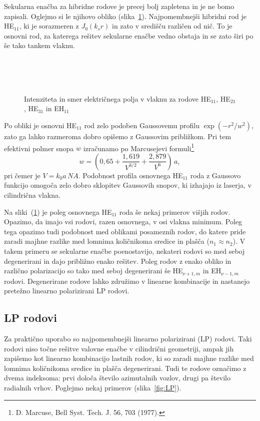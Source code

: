 Sekularna enačba za hibridne rodove je precej bolj zapletena in je ne bomo zapisali. 
Oglejmo si le njihovo obliko (slika~\ref{fig:HE11}). Najpomembnejši hibridni rod je HE$_{11}$, 
ki je sorazmeren z $J_0(k_sr)$ in zato v središču različen od nič. 
To je osnovni rod, za katerega rešitev sekularne enačbe vedno obstaja in se
zato širi po še tako tankem vlaknu. 
\begin{figure}[h]
\centering
\def\svgwidth{85truemm} 
\\
\def\svgwidth{85truemm} 
 \\
\def\svgwidth{85truemm} 
 \\
\def\svgwidth{85truemm} 

\caption{Intenziteta in smer električnega polja v vlaknu za rodove
HE$_{11}$, HE$_{21}$, HE$_{31}$ in EH$_{11}$}
\label{fig:HE11}
\end{figure}

Po obliki je osnovni HE$_{11}$ rod zelo podoben Gaussovemu profilu $\exp(-r^2/w^2)$,
zato ga lahko razmeroma dobro opišemo z Gaussovim približkom. 
Pri tem efektivni polmer snopa
$w$ izračunamo po Marcusejevi
 formuli\footnote{D. Marcuse, Bell Syst. Tech. J. 56, 703 (1977).}
\begin{equation} 
w = (0,65 + \frac{1,619}{V^{3/2}}+\frac{2,879}{V^{6}})\,a,
\label{Marcuse}
\end{equation}
pri čemer je $V = k_0 a\,NA $. Podobnost profila osnovnega
HE$_{11}$ roda z Gaussovo funkcijo omogoča zelo dobro sklopitev Gaussovih
snopov, ki izhajajo iz laserja, v cilindrična vlakna.

Na sliki~(\ref{fig:HE11}) je poleg osnovnega HE$_{11}$ roda še nekaj primerov višjih rodov. Opazimo, 
da imajo vsi rodovi, razen osnovnega, v osi vlakna minimum. Poleg tega opazimo tudi podobnost med 
oblikami posameznih rodov, do katere pride zaradi majhne razlike med lomnima količnikoma sredice in plašča
($n_1 \approx n_2$). V takem primeru se sekularne enačbe poenostavijo, nekateri rodovi so 
med seboj degenerirani in dajo približno enako rešitev. 
Poleg rodov z enako obliko in različno polarizacijo so tako 
med seboj degenerirani še HE$_{\nu+1,m}$ in EH$_{\nu-1,m}$ rodovi. Degenerirane 
rodove lahko združimo v linearne kombinacije in nastanejo pretežno 
linearno polarizirani LP rodovi. 

\subsection*{LP rodovi}
Za praktično uporabo so najpomembnejši linearno polarizirani (LP) rodovi. Taki rodovi niso
točne rešitve valovne enačbe v cilindrični geometriji, ampak jih zapišemo kot linearno 
kombinacijo lastnih rodov, ki so zaradi majhne razlike med lomnima količnikoma sredice
in plašča degenerirani. Tudi te rodove označimo z dvema indeksoma: prvi določa število azimutalnih
vozlov, drugi pa število radialnih vrhov. Poglejmo nekaj primerov (slika~\ref{fig:LP}).

